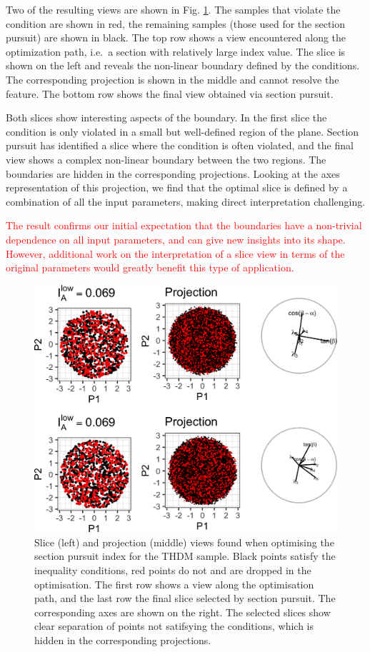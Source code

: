 \documentclass[]{interact}
\theoremstyle{plain}%
\theoremstyle{definition}
\theoremstyle{remark}
\begin{document}
Two of the resulting views are shown in Fig. \ref{fig:thdm}. The samples
that violate the condition are shown in red, the remaining samples
(those used for the section pursuit) are shown in black. The top row
shows a view encountered along the optimization path, i.e.~a section
with relatively large index value. The slice is shown on the left and
reveals the non-linear boundary defined by the conditions. The
corresponding projection is shown in the middle and cannot resolve the
feature. The bottom row shows the final view obtained via section
pursuit.

Both slices show interesting aspects of the boundary. In the first slice
the condition is only violated in a small but well-defined region of the
plane. Section pursuit has identified a slice where the condition is
often violated, and the final view shows a complex non-linear boundary
between the two regions. The boundaries are hidden in the corresponding
projections. Looking at the axes representation of this projection, we
find that the optimal slice is defined by a combination of all the input
parameters, making direct interpretation challenging.

\textcolor{red}{The result confirms our initial expectation that the boundaries have a non-trivial dependence on all input parameters, and can give new insights into its shape. However, additional work on the interpretation of a slice view in terms of the original parameters would greatly benefit this type of application.}

\begin{figure}
\includegraphics[width=1\linewidth]{section_pursuit_files/figure-latex/thdm-1} \caption{Slice (left) and projection (middle) views found when optimising the section pursuit index for the THDM sample. Black points satisfy the inequality conditions, red points do not and are dropped in the optimisation. The first row shows a view along the optimisation path, and the last row the final slice selected by section pursuit. The corresponding axes are shown on the right. The selected slices show clear separation of points not satifsying the conditions, which is hidden in the corresponding projections.}\label{fig:thdm}
\end{figure}
\end{document}
